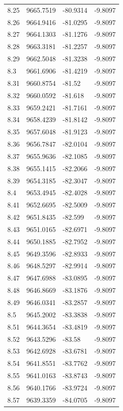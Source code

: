 \begin{table}[H]
\begin{tabular}{llll}
8.25 & 9665.7519 & -80.9314 & -9.8097 \\
8.26 & 9664.9416 & -81.0295 & -9.8097 \\
8.27 & 9664.1303 & -81.1276 & -9.8097 \\
8.28 & 9663.3181 & -81.2257 & -9.8097 \\
8.29 & 9662.5048 & -81.3238 & -9.8097 \\
8.3 & 9661.6906 & -81.4219 & -9.8097 \\
8.31 & 9660.8754 & -81.52 & -9.8097 \\
8.32 & 9660.0592 & -81.618 & -9.8097 \\
8.33 & 9659.2421 & -81.7161 & -9.8097 \\
8.34 & 9658.4239 & -81.8142 & -9.8097 \\
8.35 & 9657.6048 & -81.9123 & -9.8097 \\
8.36 & 9656.7847 & -82.0104 & -9.8097 \\
8.37 & 9655.9636 & -82.1085 & -9.8097 \\
8.38 & 9655.1415 & -82.2066 & -9.8097 \\
8.39 & 9654.3185 & -82.3047 & -9.8097 \\
8.4 & 9653.4945 & -82.4028 & -9.8097 \\
8.41 & 9652.6695 & -82.5009 & -9.8097 \\
8.42 & 9651.8435 & -82.599 & -9.8097 \\
8.43 & 9651.0165 & -82.6971 & -9.8097 \\
8.44 & 9650.1885 & -82.7952 & -9.8097 \\
8.45 & 9649.3596 & -82.8933 & -9.8097 \\
8.46 & 9648.5297 & -82.9914 & -9.8097 \\
8.47 & 9647.6988 & -83.0895 & -9.8097 \\
8.48 & 9646.8669 & -83.1876 & -9.8097 \\
8.49 & 9646.0341 & -83.2857 & -9.8097 \\
8.5 & 9645.2002 & -83.3838 & -9.8097 \\
8.51 & 9644.3654 & -83.4819 & -9.8097 \\
8.52 & 9643.5296 & -83.58 & -9.8097 \\
8.53 & 9642.6928 & -83.6781 & -9.8097 \\
8.54 & 9641.8551 & -83.7762 & -9.8097 \\
8.55 & 9641.0163 & -83.8743 & -9.8097 \\
8.56 & 9640.1766 & -83.9724 & -9.8097 \\
8.57 & 9639.3359 & -84.0705 & -9.8097 \\

\end{tabular}
\end{table}
